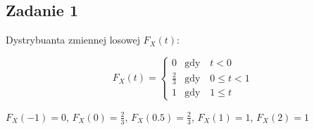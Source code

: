 \subsection{Zadanie 1}

Dystrybuanta zmiennej losowej $F_X(t)$:

$$
F_X(t) = \left\{
\begin{array}{ll}
0 & \text{gdy} \quad t < 0\\
\frac{2}{3} & \text{gdy} \quad 0 \leq t < 1\\
1 & \text{gdy} \quad 1 \leq t
\end{array}
\right.
$$

$F_X(-1) = 0$, $F_X(0) = \frac{2}{3}$, $F_X(0.5) = \frac{2}{3}$,
$F_X(1) = 1$, $F_X(2) = 1$
